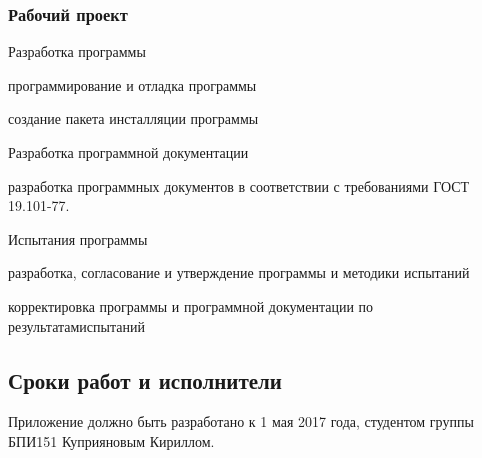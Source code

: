 \subsubsection{Рабочий проект}
\begin{my_enumerate}
	\item Разработка программы
		\begin{my_enumerate}
			\item	программирование и отладка программы
			\item 	создание пакета инсталляции программы			
		\end{my_enumerate}
	\item Разработка программной документации
		\begin{my_enumerate}
			\item разработка программных документов в соответствии с требованиями ГОСТ 19.101-77.
		\end{my_enumerate}
     \item Испытания программы
   		\begin{my_enumerate}
	     	\item разработка, согласование и утверждение программы и методики испытаний
			\item корректировка программы и программной документации по результатамиспытаний
	     \end{my_enumerate}
\end{my_enumerate}

\subsection{Сроки работ и исполнители}

Приложение должно быть разработано к 1 мая 2017 года, студентом группы БПИ151 Куприяновым Кириллом.


